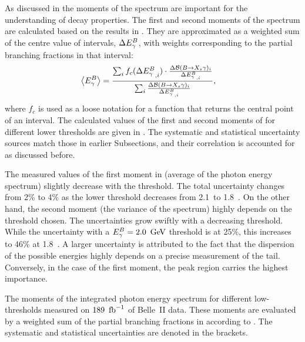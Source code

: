 As discussed in  the moments of the \BtoXsgamma
spectrum are important for the understanding of \BtoXsgamma decay properties.
The first and second moments of the \BtoXsgamma spectrum are calculated based on the results in .
They are approximated as a weighted sum of the centre value of \EB intervals, $\Delta{\ensuremath{E^B_{\gamma}}}$,
with weights corresponding to the partial branching fractions in that \EB interval:
\begin{align}\label{eq:weighted_sum_moments}
    \begin{split}
        \expval{\EB} &= \frac{\sum_i f_c(\Delta\EB^{}_{,i})\cdot  
                               \frac{\Delta\mathcal{B}(\BtoXsgamma)_i}
                                    {\Delta {E^B_{\g}}_{,i}}}
                             {\sum_i \frac{\Delta\mathcal{B}(\BtoXsgamma)_i}{\Delta {E^B_{\g}}_{,i}}},
    \end{split}
\end{align} 
where $f_c$ is used as a loose notation for a function that returns the central point of an interval.
The calculated values of the first and second moments of \EB for different lower thresholds are given in .
The systematic and statistical uncertainty sources match those in earlier Subsections, and their correlation is accounted for as discussed before.

The measured values of the first moment in  (average of the photon energy spectrum) slightly decrease with the \EB threshold.
The total uncertainty changes from 2\% to 4\% as the \EB lower threshold decreases from 2.1~\gev to 1.8~\gev.
On the other hand, the second moment (the variance of the spectrum) highly depends on the threshold chosen.
The uncertainties grow swiftly with a decreasing \EB threshold.
While the uncertainty with a ${E^B_{\gamma}}=2.0~\mathrm{\,Ge\kern -0.1em V}$ threshold is at 25\%, this increases to 46\% at 1.8~\gev.
A larger uncertainty is attributed to the fact that the dispersion of the possible \EB energies highly depends on a precise measurement of the tail.
Conversely, in the case of the first moment, the peak region carries the highest importance.


\begin{table}[hbtp!]
    \centering
    \caption{\label{tab:moments}
    The moments of the integrated \BtoXsgamma photon energy spectrum for different low-\EB thresholds measured on $189~\mbox{\,fb}^{-1}$ of Belle~II data.
    These moments are evaluated by a weighted sum of the partial branching fractions in  according to .
    The systematic and statistical uncertainties are denoted in the brackets.
    }
    
\end{table}
